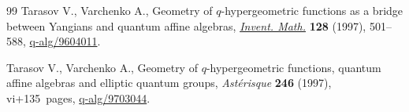 \documentclass[10pt,a4paper]{amsart}
\numberwithin{equation}{section}
\begin{document}
\begin{thebibliography}{99}
Tarasov V., Varchenko A., Geometry of {$q$}-hypergeometric functions as a
 bridge between {Y}angians and quantum affine algebras, \href{https://doi.org/10.1007/s002220050151}{\textit{Invent. Math.}}
 \textbf{128} (1997), 501--588, \href{https://arxiv.org/abs/q-alg/9604011}{q-alg/9604011}.

Tarasov V., Varchenko A., Geometry of {$q$}-hypergeometric functions, quantum
 affine algebras and elliptic quantum groups, \textit{Ast\'{e}risque}
 \textbf{246} (1997), vi+135~pages, \href{https://arxiv.org/abs/q-alg/9703044}{q-alg/9703044}.

\end{thebibliography}
\end{document}
